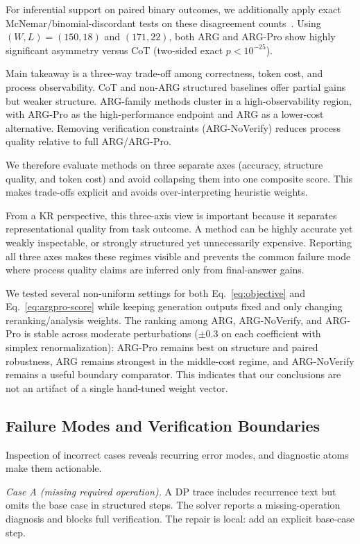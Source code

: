 \documentclass{article}
\begin{document}
For inferential support on paired binary outcomes, we additionally apply exact McNemar/binomial-discordant tests on these disagreement counts~\cite{dror2018hitchhiker}. Using \((W,L)=(150,18)\) and \((171,22)\), both ARG and ARG-Pro show highly significant asymmetry versus CoT (two-sided exact \(p<10^{-25}\)).

Main takeaway is a three-way trade-off among correctness, token cost, and process observability. CoT and non-ARG structured baselines offer partial gains but weaker structure. ARG-family methods cluster in a high-observability region, with ARG-Pro as the high-performance endpoint and ARG as a lower-cost alternative. Removing verification constraints (ARG-NoVerify) reduces process quality relative to full ARG/ARG-Pro.

We therefore evaluate methods on three separate axes (accuracy, structure quality, and token cost) and avoid collapsing them into one composite score. This makes trade-offs explicit and avoids over-interpreting heuristic weights.

From a KR perspective, this three-axis view is important because it separates representational quality from task outcome. A method can be highly accurate yet weakly inspectable, or strongly structured yet unnecessarily expensive. Reporting all three axes makes these regimes visible and prevents the common failure mode where process quality claims are inferred only from final-answer gains.

\label{sec:weight-sensitivity}
We tested several non-uniform settings for both Eq.~\eqref{eq:objective} and Eq.~\eqref{eq:argpro-score} while keeping generation outputs fixed and only changing reranking/analysis weights. The ranking among ARG, ARG-NoVerify, and ARG-Pro is stable across moderate perturbations (\(\pm 0.3\) on each coefficient with simplex renormalization): ARG-Pro remains best on structure and paired robustness, ARG remains strongest in the middle-cost regime, and ARG-NoVerify remains a useful boundary comparator. This indicates that our conclusions are not an artifact of a single hand-tuned weight vector.

\subsection{Failure Modes and Verification Boundaries}
Inspection of incorrect cases reveals recurring error modes, and diagnostic atoms make them actionable.

\emph{Case A (missing required operation).} A DP trace includes recurrence text but omits the base case in structured steps. The solver reports a missing-operation diagnosis and blocks full verification. The repair is local: add an explicit base-case step.
\end{document}
